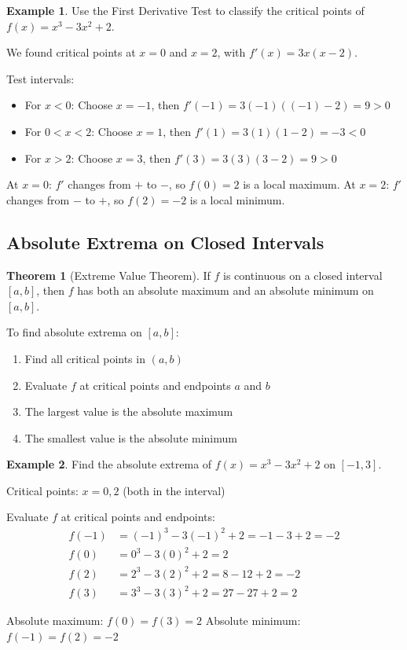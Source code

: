 \documentclass[12pt,a4paper]{book}
\theoremstyle{definition}
\newtheorem{example}{Example}[chapter]
\newtheorem{theorem}{Theorem}[chapter]
\begin{document}
\begin{example}
Use the First Derivative Test to classify the critical points of $f(x) = x^3 - 3x^2 + 2$.

We found critical points at $x = 0$ and $x = 2$, with $f'(x) = 3x(x-2)$.

Test intervals:
\begin{itemize}
    \item For $x < 0$: Choose $x = -1$, then $f'(-1) = 3(-1)((-1)-2) = 9 > 0$
    \item For $0 < x < 2$: Choose $x = 1$, then $f'(1) = 3(1)(1-2) = -3 < 0$
    \item For $x > 2$: Choose $x = 3$, then $f'(3) = 3(3)(3-2) = 9 > 0$
\end{itemize}

At $x = 0$: $f'$ changes from $+$ to $-$, so $f(0) = 2$ is a local maximum.
At $x = 2$: $f'$ changes from $-$ to $+$, so $f(2) = -2$ is a local minimum.
\end{example}

\subsection{Absolute Extrema on Closed Intervals}

\begin{theorem}[Extreme Value Theorem]
If $f$ is continuous on a closed interval $[a,b]$, then $f$ has both an absolute maximum and an absolute minimum on $[a,b]$.
\end{theorem}

\begin{keyformula}
To find absolute extrema on $[a,b]$:
\begin{enumerate}
    \item Find all critical points in $(a,b)$
    \item Evaluate $f$ at critical points and endpoints $a$ and $b$
    \item The largest value is the absolute maximum
    \item The smallest value is the absolute minimum
\end{enumerate}
\end{keyformula}

\begin{example}
Find the absolute extrema of $f(x) = x^3 - 3x^2 + 2$ on $[-1, 3]$.

Critical points: $x = 0, 2$ (both in the interval)

Evaluate $f$ at critical points and endpoints:
\begin{align}
f(-1) &= (-1)^3 - 3(-1)^2 + 2 = -1 - 3 + 2 = -2\\
f(0) &= 0^3 - 3(0)^2 + 2 = 2\\
f(2) &= 2^3 - 3(2)^2 + 2 = 8 - 12 + 2 = -2\\
f(3) &= 3^3 - 3(3)^2 + 2 = 27 - 27 + 2 = 2
\end{align}

Absolute maximum: $f(0) = f(3) = 2$
Absolute minimum: $f(-1) = f(2) = -2$
\end{example}
\end{document}
